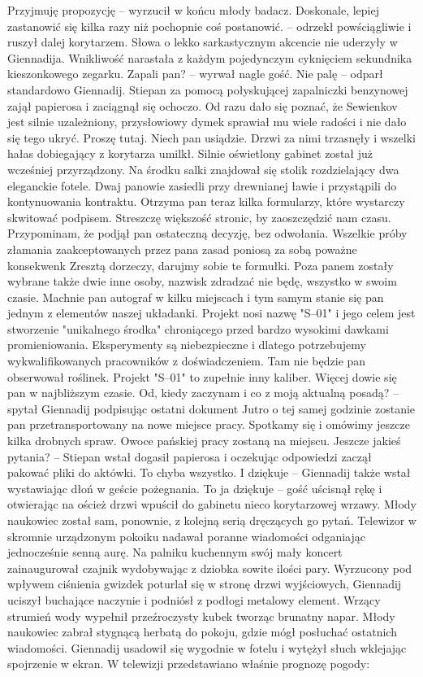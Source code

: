 \documentclass[../MAIN.tex]{subfiles}
\begin{document}
% 
\sx Przyjmuję propozycję -- wyrzucił w końcu młody badacz. 
\xx Doskonale, lepiej zastanowić się kilka razy niż pochopnie coś postanowić. -- odrzekł powściągliwie i ruszył dalej korytarzem.
\qd
Słowa o lekko sarkastycznym akcencie nie uderzyły w Giennadija. Wnikliwość narastała z każdym pojedynczym cyknięciem sekundnika kieszonkowego zegarku. 
% 
\sx Zapali pan? -- wyrwał nagle gość. 
\xx Nie palę -- odparł standardowo Giennadij. 
\qd
Stiepan za pomocą połyskującej zapalniczki benzynowej zajął papierosa i zaciągnął się ochoczo. Od razu dało się poznać, że Sewienkov jest silnie uzależniony, przysłowiowy dymek sprawiał mu wiele radości i nie dało się tego ukryć. 
% 
\sx Proszę tutaj. Niech pan usiądzie.
\qd
Drzwi za nimi trzasnęły i wszelki hałas dobiegający z korytarza umilkł. Silnie oświetlony gabinet został już wcześniej przyrządzony. Na środku salki znajdował się stolik rozdzielający dwa eleganckie fotele. Dwaj panowie zasiedli przy drewnianej ławie i przystąpili do kontynuowania kontraktu. 
% 
\sx Otrzyma pan teraz kilka formularzy, które wystarczy skwitować podpisem. Streszczę większość stronic, by zaoszczędzić nam czasu. Przypominam, że podjął pan ostateczną decyzję, bez odwołania. Wszelkie próby złamania zaakceptowanych przez pana zasad poniosą za sobą poważne konsekwen\3k Zresztą dorzeczy, darujmy sobie te formułki. Poza panem zostały wybrane także dwie inne osoby, nazwisk zdradzać nie będę, wszystko w swoim czasie. Machnie pan autograf w kilku miejscach i tym samym stanie się pan jednym z elementów naszej układanki. Projekt nosi nazwę "S--01" i jego celem jest stworzenie "unikalnego środka" chroniącego przed bardzo wysokimi dawkami promieniowania. Eksperymenty są niebezpieczne i dlatego potrzebujemy wykwalifikowanych pracowników z doświadczeniem. Tam nie będzie pan obserwował roślinek. Projekt "S--01" to zupełnie inny kaliber. Więcej dowie się pan w najbliższym czasie. 
\xx Od, kiedy zaczynam i co z moją aktualną posadą? -- spytał Giennadij podpisując ostatni dokument 
\xx Jutro o tej samej godzinie zostanie pan przetransportowany na nowe miejsce pracy. Spotkamy się i omówimy jeszcze kilka drobnych spraw. Owoce pańskiej pracy zostaną na miejscu. Jeszcze jakieś pytania? -- Stiepan wstał dogasił papierosa i oczekując odpowiedzi zaczął pakować pliki do aktówki. 
\xx To chyba wszystko. I dziękuje -- Giennadij także wstał wystawiając dłoń w geście pożegnania. 
\xx To ja dziękuje -- gość uścisnął rękę i otwierając na oścież drzwi wpuścił do gabinetu nieco korytarzowej wrzawy.
\qd
Młody naukowiec został sam, ponownie, z kolejną serią dręczących go pytań.
% 
% 
Telewizor w skromnie urządzonym pokoiku nadawał poranne wiadomości odganiając jednocześnie senną aurę. Na palniku kuchennym swój mały koncert zainaugurował czajnik wydobywając z dziobka sowite ilości pary. Wyrzucony pod wpływem ciśnienia gwizdek poturlał się w stronę drzwi wyjściowych, Giennadij uciszył buchające naczynie i podniósł z podłogi metalowy element. Wrzący strumień wody wypełnił przeźroczysty kubek tworząc brunatny napar. Młody naukowiec zabrał stygnącą herbatą do pokoju, gdzie mógł posłuchać ostatnich wiadomości. Giennadij usadowił się wygodnie w fotelu i wytężył słuch wklejając spojrzenie w ekran. W telewizji przedstawiano właśnie prognozę pogody: 
\end{document}
